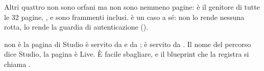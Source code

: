 \noindent
Altri quattro non sono orfani ma non sono nemmeno pagine:  è
il genitore di tutte le \num{32} pagine, ,
 e  sono
frammenti inclusi.  è un caso a sé: non lo rende
nessuna rotta, lo rende la guardia di autenticazione
().

\begin{attenzione}{ non è la pagina di Studio}
 è servito da  e da
;  è servito da
. Il nome del percorso dice Studio, la pagina è
Live. È facile sbagliare, e il blueprint che la registra si chiama
.
\end{attenzione}

